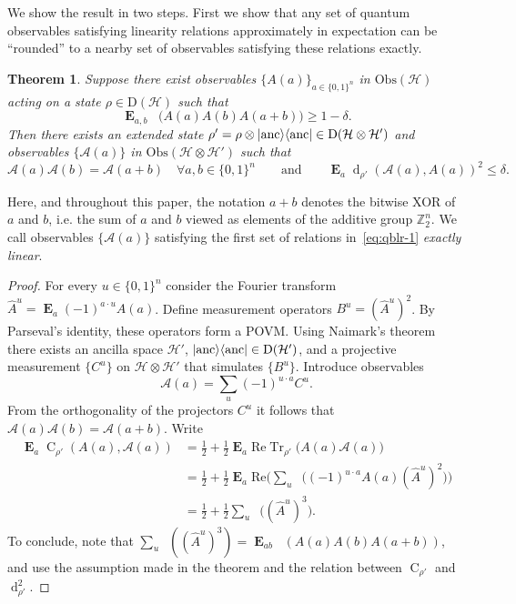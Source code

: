 \documentclass[11pt,letterpaper]{article}
\newcommand{\<}{\langle}
\renewcommand{\>}{\rangle}
\newtheorem{theorem}{Theorem}
\newcommand{\setft}[1]{\mathrm{#1}}
\newcommand{\Density}{\setft{D}}
\newcommand{\bra}[1]{\< #1 |}
\newcommand{\ket}[1]{| #1 \>}
\newcommand{\cA}{\mathcal{A}}
\newcommand{\mH}{\mathcal{H}}
\DeclareMathOperator{\E}{\mathbf{E}}
\DeclareMathOperator{\Tr}{Tr}
\DeclareMathOperator{\CON}{C}
\DeclareMathOperator{\DIS}{d}
\DeclareMathOperator{\Trho}{\Tr_\rho}
\renewcommand{\Re}{\mathrm{Re}}
\newcommand{\Obs}{\setft{Obs}}
\newcommand{\proj}[1]{\ket{#1}\bra{#1}}
\begin{document}
We show the result in two
steps. First we show that any set of quantum observables satisfying
linearity relations approximately in expectation can be ``rounded'' to a
nearby set of observables satisfying these relations exactly. 

\begin{theorem}
  Suppose there exist observables $\{A(a)\}_{a\in
  \{0,1\}^n}$ in $\Obs(\mH)$ acting on a state
  $\rho \in \Density(\mH)$ such that 
	\begin{equation}\label{eq:qblr-0}
	\E_{a, b} \Trho\big( A(a) A(b) A(a+b)\big) \geq 1-\delta.
	\end{equation}
	Then there exists an extended state $\rho' = \rho \otimes
  \proj{\rm{anc}} \in \Density(\mH\otimes \mH')$ and observables $\{\cA(a)\}$ in $\Obs(\mH\otimes\mH')$ such that 
	\begin{equation}\label{eq:qblr-1}
	\cA(a) \cA(b) = \cA(a+b) \quad \forall a, b \in \{0, 1\}^n\qquad \text{and}\qquad \E_a
  \DIS_{\rho'} (\cA(a), A(a))^2 \leq\delta.
	\end{equation}
\label{thm:qblr}
\end{theorem}

Here, and throughout this paper, the notation $a + b$ denotes the
bitwise XOR of $a$ and $b$, i.e. the sum of $a$ and $b$ viewed
as elements of the additive group ${\mathbb{Z}}_2^n$. We call observables
$\{\cA(a)\}$ satisfying the first set of relations in~\eqref{eq:qblr-1} \emph{exactly linear}.

\begin{proof}
For every $u\in\{0,1\}^n$ consider the Fourier transform  $\hat{A}^u =
\E_{a} (-1)^{a\cdot u} A(a)$. Define measurement operators
  $B^u = (\hat{A}^u)^2$.
By Parseval's identity, these operators form a POVM. Using Naimark's theorem there exists an ancilla space $\mH'$, $\proj{\rm anc}\in\Density(\mH')$, and a projective
measurement $\{C^u\}$ on $\mH\otimes \mH'$ that simulates $\{B^u\}$. Introduce 
observables
\[ \cA(a) = \sum_{u} (-1)^{u\cdot a} C^u. \]
From the orthogonality of the projectors $C^u$ it follows that $\cA(a)
\cA(b) = \cA(a+b)$. Write 
\begin{align*}
  \E_{a} \CON_{\rho'}(A(a), \cA(a))
  &= \frac{1}{2} + \frac{1}{2}\E_{a}\Re\Tr_{\rho'}\big( A(a)\cA(a)\big)\\
	&= \frac{1}{2} + \frac{1}{2}\E_{a}\Re\Big(\sum_u \Trho\big( (-1)^{u\cdot a} A(a)(\hat{A}^u)^2\big)\Big)\\
	&= \frac{1}{2} + \frac{1}{2}\sum_u \Trho\big((\hat{A}^u)^3\big).
\end{align*}
To conclude, note that
  $\sum_u \Trho((\hat{A}^u)^3) =\E_{ab} \Trho(A(a) A(b) A(a + b))$, and use the assumption made in the theorem and the relation between $\CON_{\rho'}$ and $\DIS_{\rho'}^2 $.
\end{proof}
\end{document}
